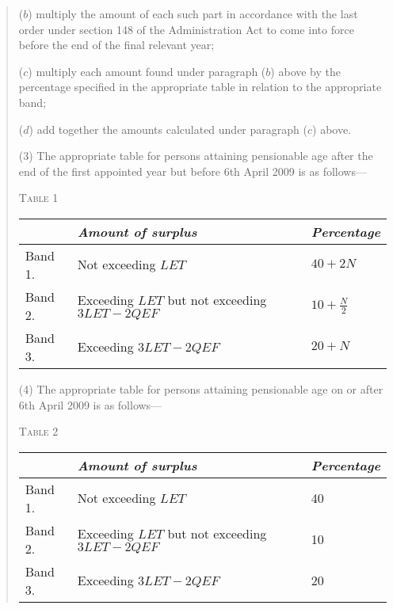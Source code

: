 \documentclass[12pt,a4paper]{article}
\begin{document}
\begin{quotation}
\begin{enumerate}
($b$) multiply the amount of each such part in accordance with the last order under section 148 of the Administration Act to come into force before the end of the final relevant year;

($c$) multiply each amount found under paragraph ($b$)  above by the percentage specified in the appropriate table in relation to the appropriate band;

($d$) add together the amounts calculated under paragraph ($c$)  above.
\end{enumerate}

(3) The appropriate table for persons attaining pensionable age after the end of the first appointed year but before 6th April 2009 is as follows—

\medskip

\noindent\textsc{Table 1}

{\noindent\footnotesize
\begin{longtable}{lll}
\hline
&\itshape Amount of surplus	&\itshape Percentage\\
\hline
\endhead
\hline
\endlastfoot
Band 1. 	&Not exceeding $LET$	&$40 + 2N$\\
Band 2. 	&Exceeding $LET$ but not exceeding $3LET - 2QEF$	&$10 + \frac{N}{2}$\\
Band 3. 	&Exceeding $3LET - 2QEF$	&$20 + N$\\
\end{longtable}

}

\medskip

(4) The appropriate table for persons attaining pensionable age on or after 6th April 2009 is as follows—

\medskip

\noindent\textsc{Table 2}

{\noindent\footnotesize
\begin{longtable}{lll}
\hline
&\itshape Amount of surplus	&\itshape Percentage\\
\hline
\endhead
\hline
\endlastfoot
Band 1. 	&Not exceeding $LET$	&40\\
Band 2. 	&Exceeding $LET$ but not exceeding $3LET - 2QEF$	&10\\
Band 3. 	&Exceeding $3LET - 2QEF$	&20\\
\end{longtable}

}
\end{quotation}
\end{document}
